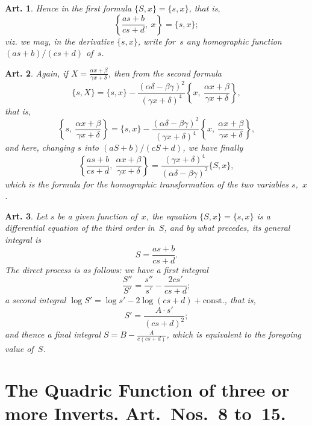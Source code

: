 \documentclass[11pt,a4paper]{article}
\theoremstyle{plain}
\newtheorem{art}{Art.}[section]
\begin{document}
\begin{art}
Hence in the first formula $\{S, x\} = \{s, x\}$, that is,
\[
\left\{\frac{as+b}{cs+d},\ x\right\} = \{s, x\};
\]
viz. we may, in the derivative $\{s, x\}$, write for~$s$ any homographic
function $(as+b)/(cs+d)$ of~$s$.
\end{art}

\begin{art}
Again, if $X = \frac{\alpha x + \beta}{\gamma x + \delta}$, then from the
second formula
\[
\{s, X\} = \{s, x\} - \frac{(\alpha\delta - \beta\gamma)^2}{(\gamma x + \delta)^4}
\left\{x,\ \frac{\alpha x + \beta}{\gamma x + \delta}\right\},
\]
that is,
\[
\left\{s,\ \frac{\alpha x + \beta}{\gamma x + \delta}\right\}
= \{s, x\} - \frac{(\alpha\delta - \beta\gamma)^2}{(\gamma x + \delta)^4}
\left\{x,\ \frac{\alpha x + \beta}{\gamma x + \delta}\right\},
\]
and here, changing $s$ into $(aS+b)/(cS+d)$, we have finally
\[
\left\{\frac{as+b}{cs+d},\ \frac{\alpha x + \beta}{\gamma x + \delta}\right\}
= \frac{(\gamma x + \delta)^4}{(\alpha\delta - \beta\gamma)^2} \{S, x\},
\]
which is the formula for the homographic transformation of the two
variables $s$,~$x$.
\end{art}

\begin{art}
Let $s$ be a given function of~$x$, the equation $\{S, x\} = \{s, x\}$ is a
differential equation of the third order in~$S$, and by what precedes, its
general integral is
\[
S = \frac{as+b}{cs+d}.
\]
The direct process is as follows: we have a first integral
\[
\frac{S''}{S'} = \frac{s''}{s'} - \frac{2cs'}{cs+d};
\]
a second integral $\log S' = \log s' - 2\log(cs+d) + \text{const.}$, that is,
\[
S' = \frac{A \cdot s'}{(cs+d)^2};
\]
and thence a final integral $S = B - \frac{A}{c(cs+d)}$, which is equivalent
to the foregoing value of~$S$.
\end{art}

\section*{The Quadric Function of three or more Inverts. Art.~Nos.~8 to~15.}
\end{document}
